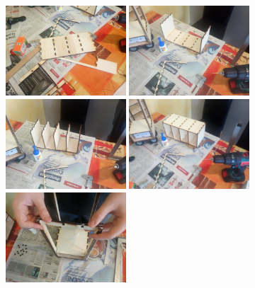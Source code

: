 \begin{figure}[H]
  \centering
  \includegraphics[width=0.4\textwidth]{building_process/assemblage_1}
  \hspace{1em}
  \includegraphics[width=0.4\textwidth]{building_process/assemblage_2}\\
  \vspace{1em}
  \includegraphics[width=0.4\textwidth]{building_process/assemblage_3}
  \hspace{1em}
  \includegraphics[width=0.4\textwidth]{building_process/assemblage_4}\\
  \vspace{1em}
  \includegraphics[width=0.4\textwidth]{building_process/assemblage_5}

\end{figure}
